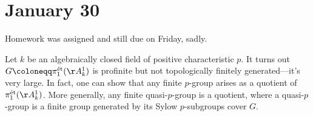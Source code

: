 \documentclass[../notes.tex]{subfiles}
\begin{document}
\section{January 30}

Homework was assigned and still due on Friday, sadly.
\begin{remark}
	Let $k$ be an algebraically closed field of positive characteristic $p$. It turns out $G\coloneqq\pi_1^{\text{\'et}}(\AA^1_k)$ is profinite but not topologically finitely generated---it's very large. In fact, one can show that any finite $p$-group arises as a quotient of $\pi_1^{\text{\'et}}(\AA^1_k)$. More generally, any finite quasi-$p$-group is a quotient, where a quasi-$p$-group is a finite group generated by its Sylow $p$-subgroups cover $G$.
\end{remark}
\end{document}
